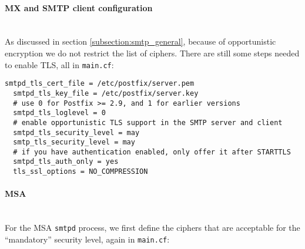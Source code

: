 



\paragraph*{MX and SMTP client configuration}\mbox{}\\

As discussed in section \ref{subsection:smtp_general}, because of opportunistic encryption we do not
restrict the list of ciphers. There are still some steps needed to
enable TLS, all in \verb|main.cf|:

\begin{lstlisting}[breaklines]
  smtpd_tls_cert_file = /etc/postfix/server.pem
  smtpd_tls_key_file = /etc/postfix/server.key
  # use 0 for Postfix >= 2.9, and 1 for earlier versions
  smtpd_tls_loglevel = 0
  # enable opportunistic TLS support in the SMTP server and client
  smtpd_tls_security_level = may
  smtp_tls_security_level = may
  # if you have authentication enabled, only offer it after STARTTLS
  smtpd_tls_auth_only = yes
  tls_ssl_options = NO_COMPRESSION
\end{lstlisting}

\paragraph*{MSA}\mbox{}\\

For the MSA \verb|smtpd| process, we first define the ciphers that are
acceptable for the ``mandatory'' security level, again in
\verb|main.cf|:


